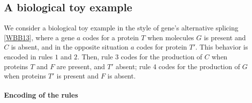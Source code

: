 \subsection{A  biological toy example}\label{subsec:toy}

\noindent
We consider a biological toy example in the style of gene's alternative splicing \ref{WBB13},
where a gene $a$  codes for a protein $T$ when molecules 
$G$ is present and $C$ is absent, and in the opposite situation $a$ codes for protein $T'$.
This behavior is encoded in rules $1$ and $2$.
Then, rule 3 codes for the production of $C$ when proteins $T$ and $F$ are present, and $T'$ absent;
rule 4 codes for the production of $G$ when  proteins $T'$ is present and $F$ is absent.

\paragraph{Encoding of the rules}

